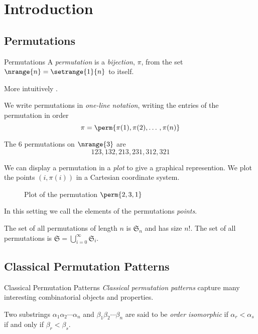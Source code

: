 \section{Introduction}
\label{sec:Introduction}
\subsection{Permutations}
\label{sub:Permutations}

\begin{frame}{Permutations}
  A \emph{permutation} is a \emph{bijection}, \(\pi\), from the set
  \(\nrange{n} = \setrange{1}{n}\) to itself.

  More intuitively .

  We write permutations in \emph{one-line notation}, writing
  the entries of the permutation in order
  \begin{equation*}
    \pi = \perm{\pi(1),\pi(2),\dotso,\pi(n)}
  \end{equation*}
  \begin{example} The \(6\) permutations on \(\nrange{3}\) are
    \begin{equation*}
      123, 132, 213, 231, 312, 321
    \end{equation*}
  \end{example}
\end{frame}

\begin{frame}
  We can display a permutation in a \emph{plot} to give a graphical
  represention. We plot the points \((i,\pi(i))\) in a Cartesian coordinate
  system.
  \begin{figure}[htb]
    \centering
    \caption{Plot of the permutation \(\perm{2,3,1}\)}
  \end{figure}
  In this setting we call the elements of the permutations \emph{points}.

  The set of all permutations of length \(n\) is \(\mathfrak{S}_n\) and
  has size \(n!\). The set of all permutations is
  \(\mathfrak{S}=\bigcup_{i=0}^{\infty}\mathfrak{S}_i\).
\end{frame}
\subsection{Classical Permutation Patterns}
\label{sub:Classical Permutation Patterns}

\begin{frame}{Classical Permutation Patterns}
  \emph{Classical permutation patterns} capture many interesting combinatorial
  objects and properties.

  \begin{definition}
    Two substrings \(\alpha_1\alpha_2\dotsm\alpha_n\) and
    \(\beta_1\beta_2\dotsm\beta_n\) are said to be \emph{order isomorphic}
    if \(\alpha_r<\alpha_s\) if and only if \(\beta_r<\beta_s\).
  \end{definition}
\end{frame}

